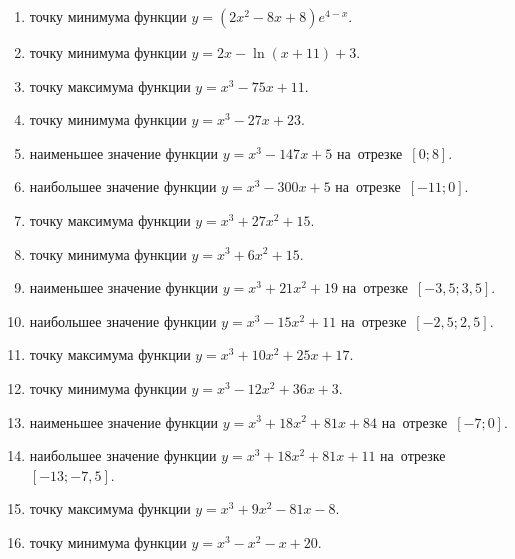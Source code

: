 \documentclass[a4paper,10pt]{article}
\begin{document}
\begin{enumerate}
\item {} точку минимума функции $y=\left(2x^2-8x+8\right){{e}^{4-x}}$.

\item {} точку минимума функции $y=2x-\ln \left(x+11\right)+3$.

\item {} точку максимума функции $y=x^3 -75x +11$.

\item {} точку минимума функции $y=x^3 -27x+23$.

\item {} наименьшее значение функции $y=x^3 -147x+5$ на~отрезке~$\left[0;8\right]$.

\item {} наибольшее значение функции $y=x^3 -300x+5$ на~отрезке~$\left[-11;0\right]$.

\item {} точку максимума функции $y=x^3 +27x^2+15$.

\item {} точку минимума функции $y=x^3 +6x^2+15$.

\item {} наименьшее значение функции $y=x^3 +21x^2+19$ на~отрезке~$\left[-3,5;3,5\right]$.

\item {} наибольшее значение функции $y=x^3 -15x^2+11$ на~отрезке~$\left[-2,5;2,5\right]$.

\item {} точку максимума функции $y=x^3 +10x^2+25x+17$.

\item {} точку минимума функции $y=x^3 -12x^2+36x+3$.

\item {} наименьшее значение функции $y=x^3 +18x^2+81x+84$ на~отрезке~$\left[-7;0\right]$.

\item {} наибольшее значение функции $y=x^3 +18x^2+81x+11$ на~отрезке~$\left[-13;-7,5\right]$.

\item {} точку максимума функции $y=x^3 +9x^2-81x-8$.

\item {} точку минимума функции $y=x^3 -x^2-x+20$.


\end{enumerate}
\end{document}
